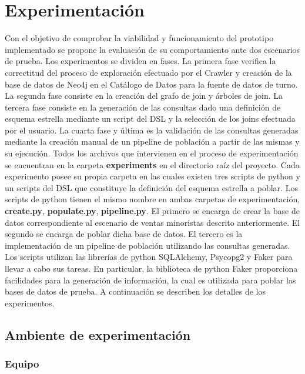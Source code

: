 \section{Experimentación} \label{section:Experimentation}

Con el objetivo de comprobar la viabilidad y funcionamiento del prototipo implementado se propone la evaluación 
de su comportamiento ante dos escenarios de prueba. Los experimentos se dividen en fases. La primera fase verifica 
la correctitud del proceso de exploración efectuado por el Crawler y creación de la base de datos de Neo4j en el  
Catálogo de Datos para la fuente de datos de turno. La segunda fase consiste en la creación 
del grafo de join y \'arboles de join. La tercera fase consiste en la generación de las consultas dado una 
definición de esquema 
estrella mediante un script del DSL y la selección de los joins efectuada por el usuario. La cuarta fase y \'ultima 
es la validación de las consultas generadas 
mediante la creación manual de un pipeline de población a partir de las mismas y su ejecución. Todos los archivos que intervienen 
en el proceso de experimentación se encuentran en la carpeta \textbf{experiments} en el directorio raíz del proyecto. 
Cada experimento posee su propia carpeta en las cuales existen tres scripts de python y un scripts del DSL que constituye 
la definición del esquema estrella a poblar. Los scripts de python tienen el mismo nombre en ambas carpetas de experimentación, 
\textbf{create.py}, \textbf{populate.py}, \textbf{pipeline.py}. El primero se encarga de 
crear la base de datos correspondiente al escenario de ventas minoristas descrito anteriormente. El segundo se 
encarga de poblar dicha base de datos. El tercero es la implementación de un pipeline de población utilizando 
las consultas generadas. Los scripts utilizan las librerías de python SQLAlchemy, Psycopg2 y Faker para llevar a 
cabo sus tareas. En particular, la biblioteca de python Faker proporciona facilidades para la generación de información, 
la cual es utilizada para poblar las bases de datos de prueba. A continuación se describen 
los detalles de los experimentos.

\subsection{Ambiente de experimentación}

\subsubsection{Equipo}

